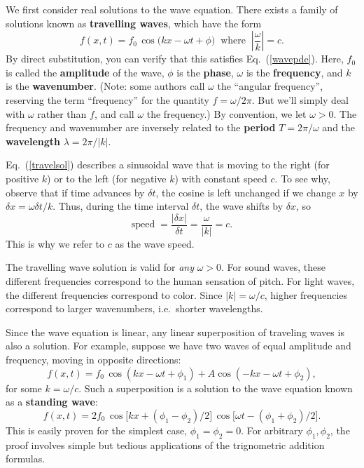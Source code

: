 \documentclass[10pt,a4paper]{article}
\begin{document}
We first consider real solutions to the wave equation. There exists a
family of solutions known as \textbf{travelling waves}, which have the
form
\begin{equation}
  f(x,t) = f_0 \, \cos\big(kx - \omega t + \phi\big)\;\;\mathrm{where}\;\; \left|\frac{\omega}{k}\right| = c.
  \label{travelsol}
\end{equation}
By direct substitution, you can verify that this satisfies
Eq.~(\ref{wavepde}).  Here, $f_0$ is called the \textbf{amplitude} of
the wave, $\phi$ is the \textbf{phase}, $\omega$ is the
\textbf{frequency}, and $k$ is the \textbf{wavenumber}. (Note: some
authors call $\omega$ the ``angular frequency'', reserving the term
``frequency'' for the quantity $f = \omega/2\pi$. But we'll simply
deal with $\omega$ rather than $f$, and call $\omega$ the frequency.)
By convention, we let $\omega > 0$. The frequency and wavenumber are
inversely related to the \textbf{period} $T = 2\pi/\omega$ and the
\textbf{wavelength} $\lambda = 2\pi/|k|$.

Eq.~(\ref{travelsol}) describes a sinusoidal wave that is moving to
the right (for positive $k$) or to the left (for negative $k$) with
constant speed $c$. To see why, observe that if time advances by
$\delta t$, the cosine is left unchanged if we change $x$ by $\delta x
= \omega \delta t / k$. Thus, during the time interval $\delta t$, the
wave shifts by $\delta x$, so
\begin{equation}
  \mathrm{speed} \; = \frac{|\delta x|}{\delta t} = \frac{\omega}{|k|} = c.
\end{equation}
This is why we refer to $c$ as the wave speed.

The travelling wave solution is valid for \emph{any} $\omega > 0$. For
sound waves, these different frequencies correspond to the human
sensation of pitch. For light waves, the different frequencies
correspond to color. Since $|k| = \omega/c$, higher frequencies
correspond to larger wavenumbers, i.e.~shorter wavelengths.

Since the wave equation is linear, any linear superposition of
traveling waves is also a solution. For example, suppose we have two
waves of equal amplitude and frequency, moving in opposite directions:
\begin{equation}
  f(x,t) = f_0 \, \cos(kx - \omega t + \phi_1) + A \cos(-kx - \omega t + \phi_2),
\end{equation}
for some $k = \omega/c$. Such a superposition is a solution to the
wave equation known as a \textbf{standing wave}:
\begin{equation}
  f(x,t) = 2f_0 \, \cos\big[kx + (\phi_1-\phi_2)/2\big]\, \cos\big[\omega t - (\phi_1+\phi_2)/2\big].
\end{equation}
This is easily proven for the simplest case, $\phi_1 = \phi_2 = 0$.
For arbitrary $\phi_1, \phi_2$, the proof involves simple but tedious
applications of the trignometric addition formulas.
\end{document}
